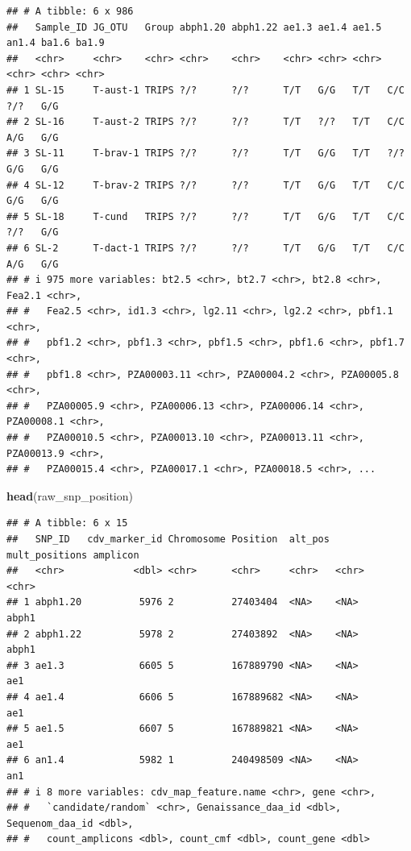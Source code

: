 \documentclass[
]{article}
\newenvironment{Shaded}{\begin{snugshade}}{\end{snugshade}}
\newcommand{\FunctionTok}[1]{\textcolor[rgb]{0.13,0.29,0.53}{\textbf{#1}}}
\newcommand{\NormalTok}[1]{#1}
\begin{document}
\begin{verbatim}
## # A tibble: 6 x 986
##   Sample_ID JG_OTU   Group abph1.20 abph1.22 ae1.3 ae1.4 ae1.5 an1.4 ba1.6 ba1.9
##   <chr>     <chr>    <chr> <chr>    <chr>    <chr> <chr> <chr> <chr> <chr> <chr>
## 1 SL-15     T-aust-1 TRIPS ?/?      ?/?      T/T   G/G   T/T   C/C   ?/?   G/G  
## 2 SL-16     T-aust-2 TRIPS ?/?      ?/?      T/T   ?/?   T/T   C/C   A/G   G/G  
## 3 SL-11     T-brav-1 TRIPS ?/?      ?/?      T/T   G/G   T/T   ?/?   G/G   G/G  
## 4 SL-12     T-brav-2 TRIPS ?/?      ?/?      T/T   G/G   T/T   C/C   G/G   G/G  
## 5 SL-18     T-cund   TRIPS ?/?      ?/?      T/T   G/G   T/T   C/C   ?/?   G/G  
## 6 SL-2      T-dact-1 TRIPS ?/?      ?/?      T/T   G/G   T/T   C/C   A/G   G/G  
## # i 975 more variables: bt2.5 <chr>, bt2.7 <chr>, bt2.8 <chr>, Fea2.1 <chr>,
## #   Fea2.5 <chr>, id1.3 <chr>, lg2.11 <chr>, lg2.2 <chr>, pbf1.1 <chr>,
## #   pbf1.2 <chr>, pbf1.3 <chr>, pbf1.5 <chr>, pbf1.6 <chr>, pbf1.7 <chr>,
## #   pbf1.8 <chr>, PZA00003.11 <chr>, PZA00004.2 <chr>, PZA00005.8 <chr>,
## #   PZA00005.9 <chr>, PZA00006.13 <chr>, PZA00006.14 <chr>, PZA00008.1 <chr>,
## #   PZA00010.5 <chr>, PZA00013.10 <chr>, PZA00013.11 <chr>, PZA00013.9 <chr>,
## #   PZA00015.4 <chr>, PZA00017.1 <chr>, PZA00018.5 <chr>, ...
\end{verbatim}

\begin{Shaded}
\begin{Highlighting}[]
\FunctionTok{head}\NormalTok{(raw\_snp\_position)}
\end{Highlighting}
\end{Shaded}

\begin{verbatim}
## # A tibble: 6 x 15
##   SNP_ID   cdv_marker_id Chromosome Position  alt_pos mult_positions amplicon
##   <chr>            <dbl> <chr>      <chr>     <chr>   <chr>          <chr>   
## 1 abph1.20          5976 2          27403404  <NA>    <NA>           abph1   
## 2 abph1.22          5978 2          27403892  <NA>    <NA>           abph1   
## 3 ae1.3             6605 5          167889790 <NA>    <NA>           ae1     
## 4 ae1.4             6606 5          167889682 <NA>    <NA>           ae1     
## 5 ae1.5             6607 5          167889821 <NA>    <NA>           ae1     
## 6 an1.4             5982 1          240498509 <NA>    <NA>           an1     
## # i 8 more variables: cdv_map_feature.name <chr>, gene <chr>,
## #   `candidate/random` <chr>, Genaissance_daa_id <dbl>, Sequenom_daa_id <dbl>,
## #   count_amplicons <dbl>, count_cmf <dbl>, count_gene <dbl>
\end{verbatim}
\end{document}
